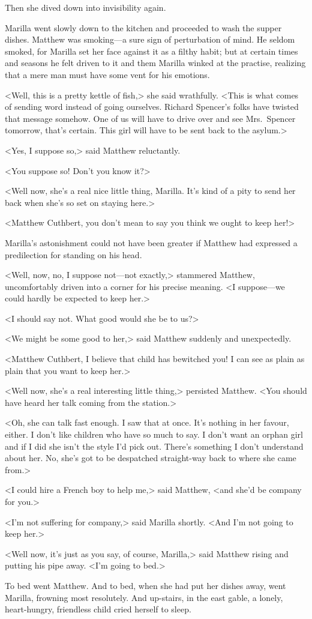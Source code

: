 Then she dived down into invisibility again.

Marilla went slowly down to the kitchen and proceeded to wash the supper dishes. Matthew was smoking—a sure sign of perturbation of mind. He seldom smoked, for Marilla set her face against it as a filthy habit; but at certain times and seasons he felt driven to it and them Marilla winked at the practise, realizing that a mere man must have some vent for his emotions.

<Well, this is a pretty kettle of fish,> she said wrathfully. <This is what comes of sending word instead of going ourselves. Richard Spencer's folks have twisted that message somehow. One of us will have to drive over and see Mrs.~Spencer tomorrow, that's certain. This girl will have to be sent back to the asylum.>

<Yes, I suppose so,> said Matthew reluctantly.

<You suppose so! Don't you know it?>

<Well now, she's a real nice little thing, Marilla. It's kind of a pity to send her back when she's so set on staying here.>

<Matthew Cuthbert, you don't mean to say you think we ought to keep her!>

Marilla's astonishment could not have been greater if Matthew had expressed a predilection for standing on his head.

<Well, now, no, I suppose not—not exactly,> stammered Matthew, uncomfortably driven into a corner for his precise meaning. <I suppose—we could hardly be expected to keep her.>

<I should say not. What good would she be to us?>

<We might be some good to her,> said Matthew suddenly and unexpectedly.

<Matthew Cuthbert, I believe that child has bewitched you! I can see as plain as plain that you want to keep her.>

<Well now, she's a real interesting little thing,> persisted Matthew. <You should have heard her talk coming from the station.>

<Oh, she can talk fast enough. I saw that at once. It's nothing in her favour, either. I don't like children who have so much to say. I don't want an orphan girl and if I did she isn't the style I'd pick out. There's something I don't understand about her. No, she's got to be despatched straight-way back to where she came from.>

<I could hire a French boy to help me,> said Matthew, <and she'd be company for you.>

<I'm not suffering for company,> said Marilla shortly. <And I'm not going to keep her.>

<Well now, it's just as you say, of course, Marilla,> said Matthew rising and putting his pipe away. <I'm going to bed.>

To bed went Matthew. And to bed, when she had put her dishes away, went Marilla, frowning most resolutely. And up-stairs, in the east gable, a lonely, heart-hungry, friendless child cried herself to sleep.

